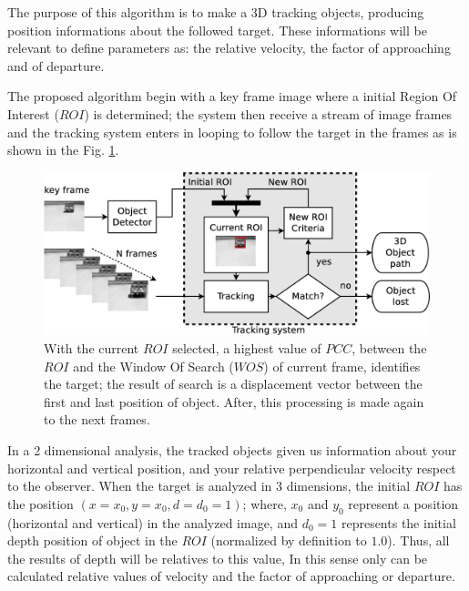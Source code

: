 The purpose of this algorithm is to make a 3D tracking objects, producing position informations 
about the followed target.
These informations will be relevant to define parameters 
as: the relative velocity, the factor of approaching and of departure.

The proposed algorithm begin with a key frame image where a initial Region Of Interest ($ROI$) is determined; 
the system then receive a stream of image frames and the tracking system 
enters in looping to follow the target in the frames as is shown in the Fig. \ref{fig:system}.


\begin{figure}[bhp]
\includegraphics[width=\columnwidth]{images/figure1-diagram1.eps}
\caption{With the current $ROI$ selected, a highest value of $PCC$, between the $ROI$ 
and the Window Of Search ($WOS$) of current frame, identifies the target; 
the result of search is a displacement vector
between the first and last position of object. 
After, this processing is made again to the next frames.}
\label{fig:system}
\end{figure}

In a 2 dimensional analysis, the tracked objects given us information about your horizontal 
and vertical position, and your relative perpendicular velocity respect to the observer.
When the target is analyzed in 3 dimensions, 
the initial $ROI$ has the position $(x=x_0,y=x_0,d=d_0=1)$;
where, $x_0$ and $y_0$ represent a position (horizontal and vertical) in the analyzed image,
and $d_0=1$ represents the initial depth position of object in the $ROI$ (normalized by definition to $1.0$).
Thus, all the results of depth will be relatives to this value, 
In this sense only can be calculated relative values of
velocity and the factor of approaching or departure. 

